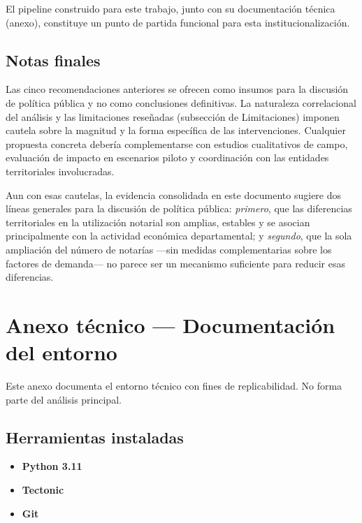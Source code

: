 \documentclass{article}
\begin{document}
El pipeline construido para este trabajo, junto con su documentación
técnica (anexo), constituye un punto de partida funcional para esta
institucionalización.

\subsection{Notas finales}

Las cinco recomendaciones anteriores se ofrecen como insumos para la
discusión de política pública y no como conclusiones definitivas. La
naturaleza correlacional del análisis y las limitaciones reseñadas
(subsección de Limitaciones) imponen cautela sobre la magnitud y la
forma específica de las intervenciones. Cualquier propuesta concreta
debería complementarse con estudios cualitativos de campo, evaluación
de impacto en escenarios piloto y coordinación con las entidades
territoriales involucradas.

Aun con esas cautelas, la evidencia consolidada en este documento
sugiere dos líneas generales para la discusión de política pública: \emph{primero},
que las diferencias territoriales en la utilización notarial son
amplias, estables y se asocian principalmente con la actividad
económica departamental; y \emph{segundo}, que la sola
ampliación del número de notarías ---sin medidas complementarias
sobre los factores de demanda--- no parece ser un mecanismo
suficiente para reducir esas diferencias.

\newpage
\appendix
\section{Anexo técnico — Documentación del entorno}

Este anexo documenta el entorno técnico con fines de replicabilidad. 
No forma parte del análisis principal.

\subsection{Herramientas instaladas}

\begin{itemize}
    \item \textbf{Python 3.11}
    \item \textbf{Tectonic}
    \item \textbf{Git}
\end{itemize}
\end{document}
